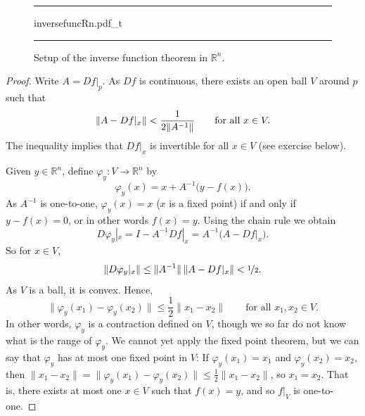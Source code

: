 \documentclass[12pt,openany]{book}
\newcommand{\avoidbreak}{\postdisplaypenalty=100}
\newcommand{\snorm}[1]{\lVert {#1} \rVert}
\newcommand{\R}{{\mathbb{R}}}
\theoremstyle{plain}
\theoremstyle{remark}
\theoremstyle{definition}
\newenvironment{myfig}{%
\begin{figure}[h!t]
\noindent\rule{\textwidth}{0.5pt}\vspace{12pt}\par\centering}%
{\par\noindent\rule{\textwidth}{0.5pt}
\end{figure}}
\theoremstyle{exercise}
\theoremstyle{example}
\begin{document}
\begin{myfig}
{inversefuncRn.pdf_t}
\caption{Setup of the inverse function theorem in $\R^n$.\label{fig:inversefuncRn}}
\end{myfig}

\begin{proof}
Write $A = Df|_p$.  As $Df$ is continuous, there exists an open ball
$V$ around $p$ such that
\begin{equation*}
\snorm{A-Df|_x} < \frac{1}{2\snorm{A^{-1}}}
\qquad \text{for all } x \in V.
\avoidbreak
\end{equation*}
The inequality implies that $Df|_x$ is invertible for all $x \in V$
(see exercise below).

Given $y \in \R^n$, define $\varphi_y \colon V \to \R^n$ by
\begin{equation*}
\varphi_y (x) = x + A^{-1}\bigl(y-f(x)\bigr) .
\end{equation*}
As $A^{-1}$ is one-to-one,
$\varphi_y(x) = x$ ($x$ is a fixed point) if and only if
$y-f(x) = 0$, or in other words $f(x)=y$.  Using the chain rule we obtain
\begin{equation*}
D\varphi_y|_x = I - A^{-1} Df|_x = A^{-1} \bigl( A-Df|_x \bigr) .
\end{equation*}
So for $x \in V$,
\begin{equation*}
\snorm{D\varphi_y|_x} \leq \snorm{A^{-1}} \, \snorm{A-Df|_x} < \nicefrac{1}{2} .
\end{equation*}
As $V$ is a ball, it is convex.  Hence,
\begin{equation*}
\snorm{\varphi_y(x_1)-\varphi_y(x_2)} \leq \frac{1}{2} \snorm{x_1-x_2} 
\qquad
\text{for all } x_1,x_2 \in V.
\end{equation*}
In other words, $\varphi_y$ is a contraction defined on $V$, though we so far
do not know what is the range of $\varphi_y$.  We cannot yet
apply the fixed
point theorem, but we can say that $\varphi_y$ 
has at most one fixed point in $V$:
If $\varphi_y(x_1) = x_1$ and
$\varphi_y(x_2) = x_2$, then
$\snorm{x_1-x_2} = \snorm{\varphi_y(x_1)-\varphi_y(x_2)} \leq
\frac{1}{2} \snorm{x_1-x_2}$, so $x_1 = x_2$.
That is, there exists at most one $x \in V$
such that $f(x) = y$, and so $f|_V$ is one-to-one.


\end{proof}
\end{document}

